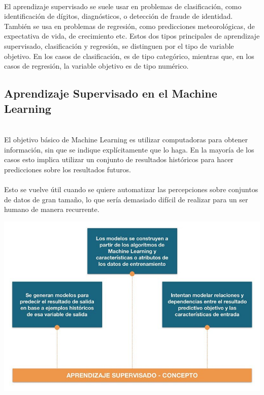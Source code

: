\documentclass[11pt,a4paper]{article}
\begin{document}
            \\El aprendizaje supervisado se suele usar en problemas de clasificación, como identificación de dígitos, diagnósticos, o detección de fraude de identidad.  También se usa en problemas de regresión, como predicciones meteorológicas, de expectativa de vida, de crecimiento etc. Estos dos tipos principales de aprendizaje supervisado, clasificación y regresión, se distinguen por el tipo de variable objetivo. En los casos de clasificación, es de tipo categórico, mientras que, en los casos de regresión, la variable objetivo es de tipo numérico.\\
            
            \subsection{Aprendizaje Supervisado en el Machine Learning}
            
            \\El objetivo básico de Machine Learning es utilizar computadoras para obtener información, sin que se indique explícitamente que lo haga. En la mayoría de los casos esto implica utilizar un conjunto de resultados históricos para hacer predicciones sobre los resultados futuros.\\ 
            
            \\Esto se vuelve útil cuando se quiere automatizar las percepciones sobre conjuntos de datos de gran tamaño, lo que sería demasiado difícil de realizar para un ser humano de manera recurrente.\\
            
            \begin{center}	\includegraphics[scale=1.0]{./Imagenes/AprendizajeSupervisadoConcepto}
    		\end{center}
    		
\end{document}

